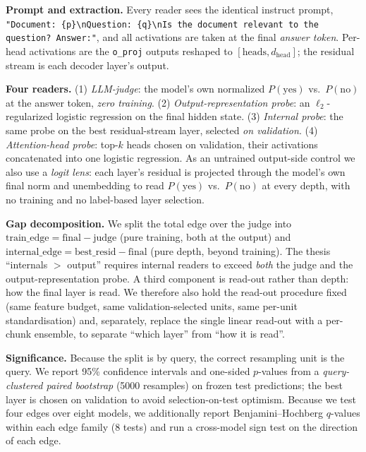 \documentclass[11pt]{article}
\begin{document}
\textbf{Prompt and extraction.} Every reader sees the identical instruct
prompt, \texttt{"Document: \{p\}\textbackslash nQuestion:
\{q\}\textbackslash nIs the document relevant to the question? Answer:"}, and
all activations are taken at the final \emph{answer token}. Per-head
activations are the \texttt{o\_proj} outputs reshaped to
$[\text{heads}, d_{\text{head}}]$; the residual stream is each decoder
layer's output.

\textbf{Four readers.} (1) \emph{LLM-judge}: the model's own normalized
$P(\text{yes})$ vs.\ $P(\text{no})$ at the answer token, \emph{zero training}.
(2) \emph{Output-representation probe}: an $\ell_2$-regularized logistic
regression on the final hidden state. (3) \emph{Internal probe}: the same
probe on the best residual-stream layer, selected \emph{on validation}.
(4) \emph{Attention-head probe}: top-$k$ heads chosen on validation, their
activations concatenated into one logistic regression. As an untrained
output-side control we also use a \emph{logit lens}: each layer's residual is
projected through the model's own final norm and unembedding to read
$P(\text{yes})$ vs.\ $P(\text{no})$ at every depth, with no training and no
label-based layer selection.

\textbf{Gap decomposition.} We split the total edge over the judge into
$\text{train\_edge} = \text{final} - \text{judge}$ (pure training, both at the
output) and $\text{internal\_edge} = \text{best\_resid} - \text{final}$ (pure
depth, beyond training). The thesis ``internals $>$ output'' requires internal
readers to exceed \emph{both} the judge and the output-representation probe.
A third component is read-out rather than depth: how the final layer is read.
We therefore also hold the read-out procedure fixed (same feature budget, same
validation-selected units, same per-unit standardisation) and, separately,
replace the single linear read-out with a per-chunk ensemble, to separate
``which layer'' from ``how it is read''.

\textbf{Significance.} Because the split is by query, the correct resampling
unit is the query. We report 95\% confidence intervals and one-sided
$p$-values from a \emph{query-clustered paired bootstrap} (5000 resamples) on
frozen test predictions; the best layer is chosen on validation to avoid
selection-on-test optimism. Because we test four edges over eight models, we
additionally report Benjamini--Hochberg $q$-values within each edge family
(8 tests) and run a cross-model sign test on the direction of each edge.
\end{document}
